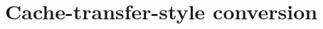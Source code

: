 \chapter{Cache-transfer-style conversion}
\label{part:caching}
\label{ch:cts}
\newcommand{\poplPath}[1]{popl18/#1}






